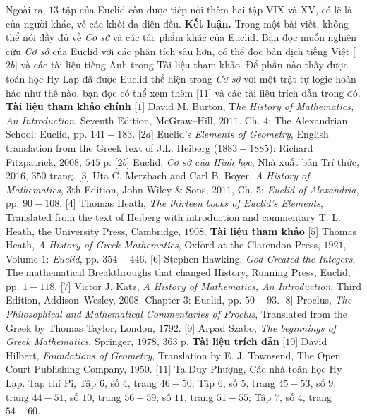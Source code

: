 \begin{multicols}{2}
	\vskip 0.1cm
	Ngoài ra, $13$ tập của Euclid còn được tiếp nối thêm hai tập VIX và XV, có lẽ là của người khác, về các khối đa diện đều.     
	\vskip 0.1cm
	\textbf{\color{lichsutoanhoc}Kết luận.} Trong một bài viết, không thể nói đầy đủ về \textit{Cơ sở} và các tác phẩm khác của Euclid. Bạn đọc muốn nghiên cứu \textit{Cơ sở} của Euclid với các phân tích sâu hơn, có thể đọc bản dịch tiếng Việt [$2b$] và các tài liệu tiếng Anh trong Tài liệu tham khảo. Để phần nào thấy được toán học Hy Lạp đã được Euclid thể hiện trong \textit{Cơ sở} với một trật tự logic hoàn hảo như thế nào, bạn đọc có thể xem thêm [$11$] và các tài liệu trích dẫn trong đó. 
	\vskip 0.1cm
	\textbf{\color{lichsutoanhoc}Tài liệu tham khảo chính}
	\vskip 0.1cm
	[$1$] David M. Burton, T\textit{he History of Mathematics, An Introduction}, Seventh Edition, McGraw--Hill, $2011$. Ch. $4$: The Alexandrian School: Euclid, pp. $141-183$.
	\vskip 0.1cm
	[$2a$] Euclid's \textit{Elements of Geometry}, English translation from the Greek text of J.L. Heiberg ($1883-1885$): Richard Fitzpatrick, $2008$, $545$ p.
	\vskip 0.1cm
	[$2b$] Euclid, \textit{Cơ sở của Hình học}, Nhà xuất bản Trí thức, $2016$, $350$ trang.
	\vskip 0.1cm
	[$3$] Uta C. Merzbach and Carl B. Boyer, \textit{A
	History of Mathematics}, $3$th Edition, John Wiley \& Sons, $2011$, Ch. $5$: \textit{Euclid of Alexandria}, pp. $90-108$.
	\vskip 0.1cm
	[$4$] Thomas Heath, \textit{The thirteen books of Euclid’s Elements}, Translated from the text of Heiberg with introduction and commentary T. L. Heath, the University Press, Cambridge, $1908$.
	\vskip 0.1cm   
	\textbf{\color{lichsutoanhoc}Tài liệu tham khảo}
	\vskip 0.1cm
	[$5$] Thomas Heath, \textit{A History of Greek Mathematics}, Oxford at the Clarendon Press, $1921$, Volume $1$: \textit{Euclid}, pp. $354-446$.
	\vskip 0.1cm   
	[$6$] Stephen Hawking, \textit{God Created the Integers}, The mathematical Breakthroughs that changed History, Running Press, Euclid, pp. $1-118$.   
	\vskip 0.1cm
	[$7$] Victor J. Katz, \textit{A History of Mathematics, An Introduction}, Third Edition, Addison--Wesley, $2008$. Chapter $3$: Euclid, pp. $50-93$.
	\vskip 0.1cm
	[$8$] Proclus, \textit{The Philosophical and Mathematical Commentaries of Proclus}, Translated from the Greek by Thomas Taylor, London, $1792$.
	\vskip 0.1cm   
	[9] Arpad Szabo, \textit{The beginnings of Greek Mathematics}, Springer, $1978$, $363$ p.
	\vskip 0.1cm
	\textbf{\color{lichsutoanhoc}Tài liệu trích dẫn}
	\vskip 0.1cm
	[$10$] David Hilbert, \textit{Foundations of Geometry}, Translation by E. J. Townsend, The Open Court Publishing Company, $1950$.
	\vskip 0.1cm
	[$11$] Tạ Duy Phượng, Các nhà toán học Hy Lạp. Tạp chí Pi, Tập $6$, số $4$, trang $46-50$; Tập $6$, số $5$, trang $45-53$, số $9$, trang $44-51$, số $10$, trang $56-59$; số $11$, trang $51-55$; Tập $7$, số $4$, trang $54-60$.
\end{multicols}